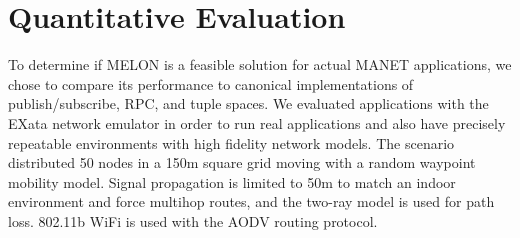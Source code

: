 \documentclass[lnicst]{svmultln}
\begin{document}



\section{Quantitative Evaluation}\label{sec:evaluation}

To determine if MELON is a feasible solution for actual MANET applications, we chose to compare its performance to canonical implementations of publish/subscribe, RPC, and tuple spaces. We evaluated applications with the EXata network emulator\cite{exata} in order to run real applications and also have precisely repeatable environments with high fidelity network models. The scenario distributed 50 nodes in a 150m square grid moving with a random waypoint mobility model. Signal propagation is limited to 50m to match an indoor environment and force multihop routes, and the two-ray model is used for path loss. 802.11b WiFi is used with the AODV routing protocol.
\end{document}
